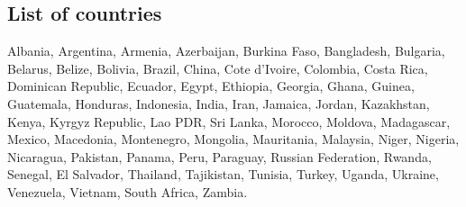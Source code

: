 \documentclass[12pt, a4paper]{article}
\begin{document}
\newpage
\begin{appendices}
	\section{List of countries} \label{CountryList}
	Albania, Argentina, Armenia, Azerbaijan, Burkina Faso, Bangladesh, Bulgaria, Belarus, Belize, Bolivia, Brazil, China, Cote d'Ivoire, Colombia, Costa Rica, Dominican Republic, Ecuador, Egypt, Ethiopia, Georgia, Ghana, Guinea, Guatemala, Honduras, Indonesia, India, Iran, Jamaica, Jordan, Kazakhstan, Kenya, Kyrgyz Republic, Lao PDR, Sri Lanka, Morocco, Moldova, Madagascar, Mexico, Macedonia, Montenegro, Mongolia, Mauritania, Malaysia, Niger, Nigeria, Nicaragua, Pakistan, Panama, Peru, Paraguay, Russian Federation, Rwanda, Senegal, El Salvador, Thailand, Tajikistan, Tunisia, Turkey, Uganda, Ukraine, Venezuela, Vietnam, South Africa, Zambia.


\end{appendices}
\end{document}
